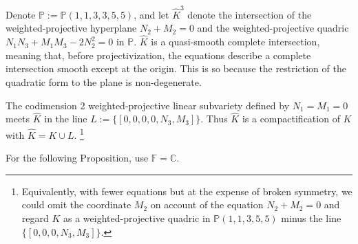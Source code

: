 \documentclass[12pt]{article}
\numberwithin{equation}{section}
\newcounter{count}
\theoremstyle{plain}
\theoremstyle{definition}
\renewcommand{\P}{\mathbb{P}}
\newcommand{\C}{\mathbb{C}}
\newcommand{\Fb}{\mathbb{F}}
\begin{document}
Denote $\P:=\P(1,1,3,3,5,5)$, and let $\widehat{K}^{3}$ denote the intersection of the weighted-projective hyperplane $N_2+M_2=0$ and the weighted-projective quadric $N_1N_3+M_1M_3-2N_2^2=0$ in $\P$. $\widehat{K}$ is a quasi-smooth complete intersection, meaning that, before projectivization, the equations describe a complete intersection smooth except at the origin. This is so because the restriction of the quadratic form to the plane is non-degenerate.

The codimension 2 weighted-projective linear subvariety defined by $N_1=M_1=0$ meets $\widehat{K}$ in the line $L:=\{[0,0,0,0,N_3,M_3]\}$. Thus $\widehat{K}$ is a compactification of $K$ with $\widehat{K}=K\cup L$. \footnote{Equivalently, with fewer equations but at the expense of broken symmetry, we could omit the coordinate $M_2$ on account of the equation $N_2+M_2=0$ and regard $K$ as a weighted-projective quadric in $\P(1,1,3,5,5)$ minus the line $\{[0,0,0,N_3,M_3]\}$.}

For the following Proposition, use $\Fb = \C$.
\end{document}
